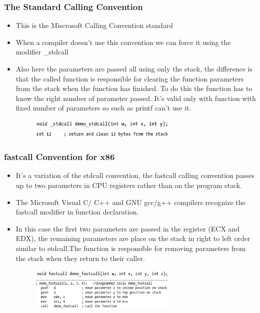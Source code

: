 \documentclass[]{beamer}
\begin{document}
		\begin{frame}
			\frametitle{The Standard Calling Convention}
			\begin{itemize}
				\item{This is the Miscrosoft Calling Convention standard}
				\item{When a compiler doesn't use this convention we can force it using the modifier \color{red}\_stdcall}
				\item{Also here the parameters are passed all using only the stack, the difference  is that the called function is responsible for clearing the function parameters from the stack when the function has finished. To do this the function has to know the right number of parameter passed. It's valid only with function with fixed number of parameters so such as printf can't use it.}
				\begin{figure}
					\includegraphics[width=7cm]{images/demo_stdcall.eps}\\
					\includegraphics[width=7cm]{images/clear_stack.eps}
				\end{figure}	
			\end{itemize}
		\end{frame}
		\begin{frame}
			\frametitle{fastcall Convention for x86}
			\begin{itemize}
				\item{It's a variation of the stdcall convention, the fastcall  calling convention passes up to two parameters in CPU registers rather than on the program stack.}
				\item{The Microsoft Visual C/ C++ and GNU gcc/g++ compilers recognize the \color{red}fastcall\color{black} modifier in function declaration.}
				\item{In this case the first two parameters are passed in the register (ECX and EDX), the remaining parameters are place on the stack in right to left order similar to stdcall.The function is responsible for removing parameters from the stack when they return to their caller.}
				\begin{figure}
					\includegraphics[width=7cm]{images/demo_fastcall.eps}\\
					\includegraphics[width=7cm]{images/fastcall_place.eps}\\
				\end{figure}
			\end{itemize}
		\end{frame}
\end{document}
